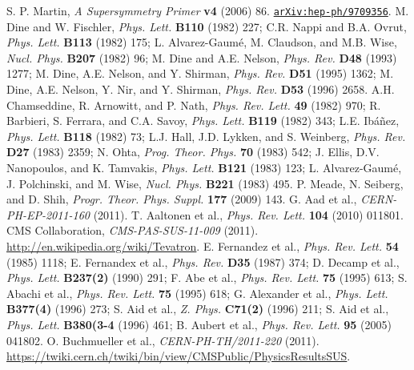 \documentclass[12pt, letterpaper]{report}
\begin{document}
\begin{thebibliography}{99}
 S. P. Martin, \textit{A Supersymmetry Primer} \textbf{v4} (2006) 86.  \href{http://arxiv.org/abs/hep-ph/9709356}{\texttt{arXiv:hep-ph/9709356}}.
 M. Dine and W. Fischler, \textit{Phys. Lett.} \textbf{B110} (1982) 227; C.R. Nappi and B.A. Ovrut, \textit{Phys. Lett.} \textbf{B113} (1982) 175; L. Alvarez-Gaum\'e, M. Claudson, and M.B. Wise, \textit{Nucl. Phys.} \textbf{B207} (1982) 96; M. Dine and A.E. Nelson, \textit{Phys. Rev.} \textbf{D48} (1993) 1277; M. Dine, A.E. Nelson, and Y. Shirman, \textit{Phys. Rev.} \textbf{D51} (1995) 1362; M. Dine, A.E. Nelson, Y. Nir, and Y. Shirman, \textit{Phys. Rev.} \textbf{D53} (1996) 2658.
 A.H. Chamseddine, R. Arnowitt, and P. Nath, \textit{Phys. Rev. Lett.} \textbf{49} (1982) 970; R. Barbieri, S. Ferrara, and C.A. Savoy, \textit{Phys. Lett.} \textbf{B119} (1982) 343; L.E. Ib\'a\~{n}ez, \textit{Phys. Lett.} \textbf{B118} (1982) 73; L.J. Hall, J.D. Lykken, and S. Weinberg, \textit{Phys. Rev.} \textbf{D27} (1983) 2359; N. Ohta, \textit{Prog. Theor. Phys.} \textbf{70} (1983) 542; J. Ellis, D.V. Nanopoulos, and K. Tamvakis, \textit{Phys. Lett.} \textbf{B121} (1983) 123; L. Alvarez-Gaum\'e, J. Polchinski, and M. Wise, \textit{Nucl. Phys.} \textbf{B221} (1983) 495.
 P. Meade, N. Seiberg, and D. Shih, \textit{Progr. Theor. Phys. Suppl.} \textbf{177} (2009) 143.
 G. Aad et al., \textit{CERN-PH-EP-2011-160} (2011).
 T. Aaltonen et al., \textit{Phys. Rev. Lett.} \textbf{104} (2010) 011801.
 CMS Collaboration, \textit{CMS-PAS-SUS-11-009} (2011).
 \url{http://en.wikipedia.org/wiki/Tevatron}.
 E. Fernandez et al., \textit{Phys. Rev. Lett.} \textbf{54} (1985) 1118; E. Fernandex et al., \textit{Phys. Rev.} \textbf{D35} (1987) 374; D. Decamp et al., \textit{Phys. Lett.} \textbf{B237(2)} (1990) 291; F. Abe et al., \textit{Phys. Rev. Lett.} \textbf{75} (1995) 613; S. Abachi et al., \textit{Phys. Rev. Lett.} \textbf{75} (1995) 618; G. Alexander et al., \textit{Phys. Lett.} \textbf{B377(4)} (1996) 273; S. Aid et al., \textit{Z. Phys.} \textbf{C71(2)} (1996) 211; S. Aid et al., \textit{Phys. Lett.} \textbf{B380(3-4} (1996) 461; B. Aubert et al., \textit{Phys. Rev. Lett.} \textbf{95} (2005) 041802.
 O. Buchmueller et al., \textit{CERN-PH-TH/2011-220} (2011).
 \url{https://twiki.cern.ch/twiki/bin/view/CMSPublic/PhysicsResultsSUS}.

\end{thebibliography}
\end{document}
